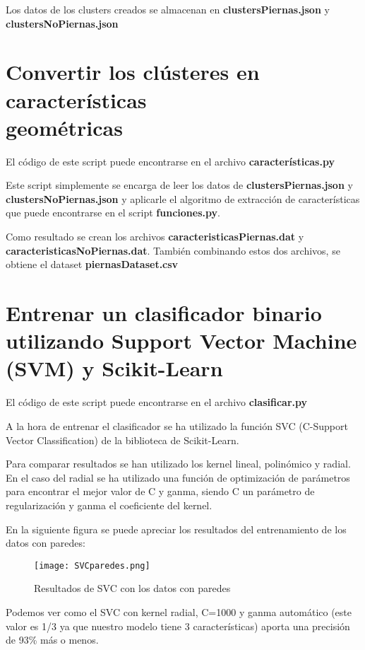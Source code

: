 Los datos de los clusters creados se almacenan en \textbf{clustersPiernas.json} y \textbf{clustersNoPiernas.json}

\section{Convertir los clústeres en características \\ geométricas}

El código de este script puede encontrarse en el archivo \textbf{características.py}

Este script simplemente se encarga de leer los datos de \textbf{clustersPiernas.json} y \textbf{clustersNoPiernas.json} y aplicarle el algoritmo de extracción de características que puede encontrarse en el script \textbf{funciones.py}.

Como resultado se crean los archivos \textbf{caracteristicasPiernas.dat} y \textbf{caracteristicasNoPiernas.dat}. También combinando estos dos archivos, se obtiene el dataset \textbf{piernasDataset.csv}

\newpage

\section{Entrenar un clasificador binario utilizando Support Vector Machine (SVM) y Scikit-Learn}

El código de este script puede encontrarse en el archivo \textbf{clasificar.py}

A la hora de entrenar el clasificador se ha utilizado la función SVC (C-Support Vector Classification) de la biblioteca de Scikit-Learn.

Para comparar resultados se han utilizado los kernel lineal, polinómico y radial. En el caso del radial se ha utilizado una función de optimización de parámetros para encontrar el mejor valor de C y ganma, siendo C un parámetro de regularización y ganma el coeficiente del kernel.

En la siguiente figura se puede apreciar los resultados del entrenamiento de los datos con paredes:

\begin{figure}[H]
	\centering
	\texttt{[image: SVCparedes.png]}
	\caption{Resultados de SVC con los datos con paredes}
\end{figure}

Podemos ver como el SVC con kernel radial, C=1000 y ganma automático (este valor es 1/3 ya que nuestro modelo tiene 3 características) aporta una precisión de 93\% más o menos.

